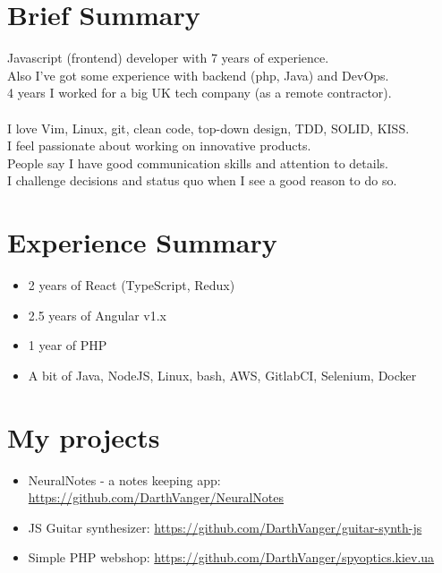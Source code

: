 \documentclass[a4paper, 14pt]{article}
\begin{document}
\begin{center}
	\textsc{\Huge{}}
\end{center}


\section{Brief Summary}
  Javascript (frontend) developer with 7 years of experience.  \\
  Also I've got some experience with backend (php, Java) and DevOps.  \\
  4 years I worked for a big UK tech company (as a remote contractor). \\
  \\
  I love Vim, Linux, git, clean code, top-down design, TDD, SOLID, KISS. \\
  I feel passionate about working on innovative products. \\
  People say I have good communication skills and attention to details. \\
  I challenge decisions and status quo when I see a good reason to do so.

\section{Experience Summary}
  \begin{itemize}
    \item 2 years of React (TypeScript, Redux) \\
    \item 2.5 years of Angular v1.x \\ 
    \item 1 year of PHP \\
    \item A bit of Java, NodeJS, Linux, bash, AWS, GitlabCI, Selenium, Docker
  \end{itemize}

\section{My projects}
  \begin{itemize}
    \item NeuralNotes - a notes keeping app: \url{https://github.com/DarthVanger/NeuralNotes} \\
    \item JS Guitar synthesizer: \url{https://github.com/DarthVanger/guitar-synth-js} \\
    \item Simple PHP webshop: \url{https://github.com/DarthVanger/spyoptics.kiev.ua}
  \end{itemize}
\end{document}
